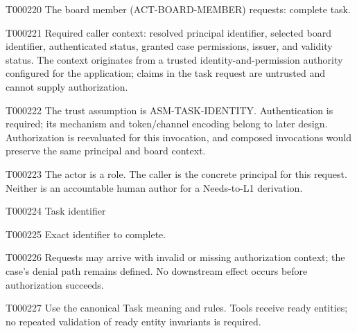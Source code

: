 \documentclass[11pt,a4paper]{article}
\begin{document}
\begin{atlasparagraph}{T000220}
The board member (ACT-BOARD-MEMBER) requests: complete task.
\end{atlasparagraph}
\begin{atlasparagraph}{T000221}
Required caller context: resolved principal identifier, selected board identifier, authenticated status, granted case permissions, issuer, and validity status. The context originates from a trusted identity-and-permission authority configured for the application; claims in the task request are untrusted and cannot supply authorization.
\end{atlasparagraph}
\begin{atlasparagraph}{T000222}
The trust assumption is ASM-TASK-IDENTITY. Authentication is required; its mechanism and token/channel encoding belong to later design. Authorization is reevaluated for this invocation, and composed invocations would preserve the same principal and board context.
\end{atlasparagraph}
\begin{atlasparagraph}{T000223}
The actor is a role. The caller is the concrete principal for this request. Neither is an accountable human author for a Needs-to-L1 derivation.
\end{atlasparagraph}
\begin{atlastext}{T000224}
Task identifier
\end{atlastext}
\begin{atlasparagraph}{T000225}
Exact identifier to complete.
\end{atlasparagraph}
\begin{atlasparagraph}{T000226}
Requests may arrive with invalid or missing authorization context; the case's denial path remains defined. No downstream effect occurs before authorization succeeds.
\end{atlasparagraph}
\begin{atlasparagraph}{T000227}
Use the canonical Task meaning and rules. Tools receive ready entities; no repeated validation of ready entity invariants is required.
\end{atlasparagraph}
\end{document}
